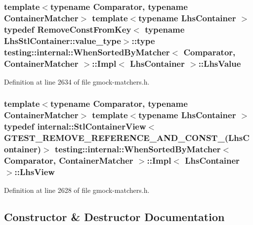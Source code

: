 \subsubsection[{\texorpdfstring{Lhs\+Value}{LhsValue}}]{\setlength{\rightskip}{0pt plus 5cm}template$<$typename Comparator, typename Container\+Matcher$>$ template$<$typename Lhs\+Container $>$ typedef {\bf Remove\+Const\+From\+Key}$<$ typename Lhs\+Stl\+Container\+::value\+\_\+type$>$\+::type {\bf testing\+::internal\+::\+When\+Sorted\+By\+Matcher}$<$ Comparator, Container\+Matcher $>$\+::{\bf Impl}$<$ Lhs\+Container $>$\+::{\bf Lhs\+Value}}\hypertarget{classtesting_1_1internal_1_1_when_sorted_by_matcher_1_1_impl_a93044f4ba53373fcfc424132b5e6c462}{}\label{classtesting_1_1internal_1_1_when_sorted_by_matcher_1_1_impl_a93044f4ba53373fcfc424132b5e6c462}


Definition at line 2634 of file gmock-\/matchers.\+h.

\subsubsection[{\texorpdfstring{Lhs\+View}{LhsView}}]{\setlength{\rightskip}{0pt plus 5cm}template$<$typename Comparator, typename Container\+Matcher$>$ template$<$typename Lhs\+Container $>$ typedef {\bf internal\+::\+Stl\+Container\+View}$<$ {\bf G\+T\+E\+S\+T\+\_\+\+R\+E\+M\+O\+V\+E\+\_\+\+R\+E\+F\+E\+R\+E\+N\+C\+E\+\_\+\+A\+N\+D\+\_\+\+C\+O\+N\+S\+T\+\_\+}(Lhs\+Container)$>$ {\bf testing\+::internal\+::\+When\+Sorted\+By\+Matcher}$<$ Comparator, Container\+Matcher $>$\+::{\bf Impl}$<$ Lhs\+Container $>$\+::{\bf Lhs\+View}}\hypertarget{classtesting_1_1internal_1_1_when_sorted_by_matcher_1_1_impl_a4c84fddfe1bf967a73e5dae1940db427}{}\label{classtesting_1_1internal_1_1_when_sorted_by_matcher_1_1_impl_a4c84fddfe1bf967a73e5dae1940db427}


Definition at line 2628 of file gmock-\/matchers.\+h.



\subsection{Constructor \& Destructor Documentation}
